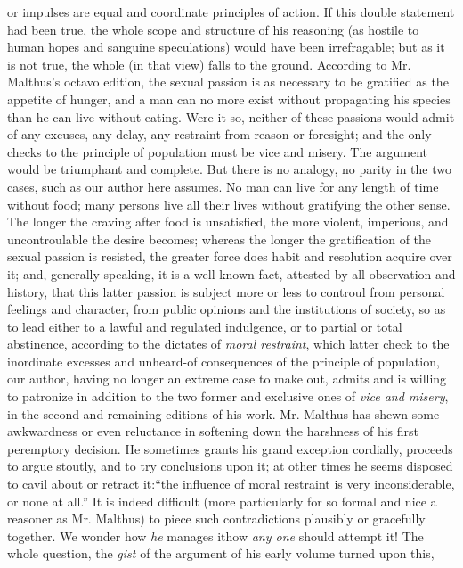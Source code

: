 or impulses are equal and coordinate principles of action. If this
double statement had been true, the whole scope and structure of
his reasoning (as hostile to human hopes and sanguine
speculations) would have been irrefragable; but as it is not true,
the whole (in that view) falls to the ground. According to
Mr. Malthus's octavo edition, the sexual passion is as necessary
to be gratified as the appetite of hunger, and a man can no more
exist without propagating his species than he can live without
eating. Were it so, neither of these passions would admit of any
excuses, any delay, any restraint from reason or foresight; and
the only checks to the principle of population must be vice and
misery. The argument would be triumphant and complete.  But there
is no analogy, no parity in the two cases, such as our author here
assumes. No man can live for any length of time without food; many
persons live all their lives without gratifying the other sense.
The longer the craving after food is unsatisfied, the more
violent, imperious, and uncontroulable the desire becomes; whereas
the longer the gratification of the sexual passion is resisted,
the greater force does habit and resolution acquire over it; and,
generally speaking, it is a well-known fact, attested by all
observation and history, that this latter passion is subject more
or less to controul from personal feelings and character, from
public opinions and the institutions of society, so as to lead
either to a lawful and regulated indulgence, or to partial or
total abstinence, according to the dictates of \emph{moral
restraint}, which latter check to the inordinate excesses and
unheard-of consequences of the principle of population, our
author, having no longer an extreme case to make out, admits and
is willing to patronize in addition to the two former and
exclusive ones of \emph{vice and misery}, in the second and
remaining editions of his work. Mr. Malthus has shewn some
awkwardness or even reluctance in softening down the harshness of
his first peremptory decision. He sometimes grants his grand
exception cordially, proceeds to argue stoutly, and to try
conclusions upon it; at other times he seems disposed to cavil
about or retract it:\textemdash ``the influence of moral restraint
is very inconsiderable, or none at all.'' It is indeed difficult
(more particularly for so formal and nice a reasoner as
Mr. Malthus) to piece such contradictions plausibly or gracefully
together. We wonder how \emph{he} manages it\textemdash how
\emph{any one} should attempt it! The whole question, the
\emph{gist} of the argument of his early volume turned upon this,
